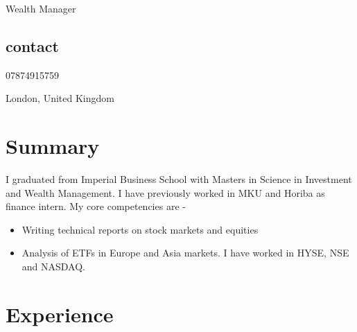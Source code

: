 \documentclass[10pt]{friggeri-cv}
\begin{document}
       {Wealth Manager}


\begin{aside}
  \section{contact}
    07874915759

    London, United Kingdom

    

\end{aside}

\section{Summary}

 I graduated from Imperial Business School with Masters in Science in Investment and Wealth Management. I have previously worked in MKU and Horiba as finance intern. My core competencies are - 

\begin{itemize} 
	\item Writing technical reports on stock markets and equities 
	\item Analysis of ETFs in Europe and Asia markets. I have worked in HYSE, NSE and NASDAQ. 
\end{itemize} 


\section{Experience}
\end{document}
